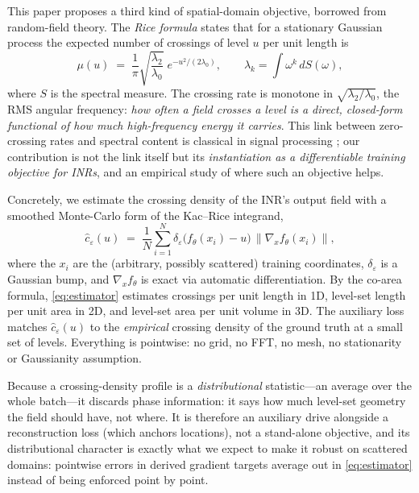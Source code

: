 \documentclass[10pt]{article}
\begin{document}
This paper proposes a third kind of spatial-domain objective, borrowed from random-field
theory. The \emph{Rice formula} \citep{rice1944,kac1943} states that for a stationary
Gaussian process the expected number of crossings of level $u$ per unit length is
\begin{equation}
\mu(u) \;=\; \frac{1}{\pi}\sqrt{\frac{\lambda_2}{\lambda_0}}\;
e^{-u^2/(2\lambda_0)},
\qquad \lambda_k = \int \omega^k \, dS(\omega),
\label{eq:rice}
\end{equation}
where $S$ is the spectral measure. The crossing rate is monotone in
$\sqrt{\lambda_2/\lambda_0}$, the RMS angular frequency: \emph{how often a field crosses
a level is a direct, closed-form functional of how much high-frequency energy it
carries}. This link between zero-crossing rates and spectral content is classical in
signal processing \citep{kedem1986zerocrossings,longuethiggins1957}; our contribution is
not the link itself but its \emph{instantiation as a differentiable training objective
for INRs}, and an empirical study of where such an objective helps.

Concretely, we estimate the crossing density of the INR's output field with a smoothed
Monte-Carlo form of the Kac--Rice integrand,
\begin{equation}
\hat c_\varepsilon(u) \;=\; \frac{1}{N}\sum_{i=1}^N
\delta_\varepsilon\!\bigl(f_\theta(x_i)-u\bigr)\,
\bigl\lVert \nabla_x f_\theta(x_i)\bigr\rVert,
\label{eq:estimator}
\end{equation}
where the $x_i$ are the (arbitrary, possibly scattered) training coordinates,
$\delta_\varepsilon$ is a Gaussian bump, and $\nabla_x f_\theta$ is exact via automatic
differentiation. By the co-area formula, \eqref{eq:estimator} estimates crossings per
unit length in 1D, level-set length per unit area in 2D, and level-set area per unit
volume in 3D. The auxiliary loss matches $\hat c_\varepsilon(u)$ to the \emph{empirical}
crossing density of the ground truth at a small set of levels. Everything is pointwise:
no grid, no FFT, no mesh, no stationarity or Gaussianity assumption.

Because a crossing-density profile is a \emph{distributional} statistic---an average
over the whole batch---it discards phase information: it says how much level-set
geometry the field should have, not where. It is therefore an auxiliary drive alongside
a reconstruction loss (which anchors locations), not a stand-alone objective, and its
distributional character is exactly what we expect to make it robust on scattered
domains: pointwise errors in derived gradient targets average out in
\eqref{eq:estimator} instead of being enforced point by point.
\end{document}
